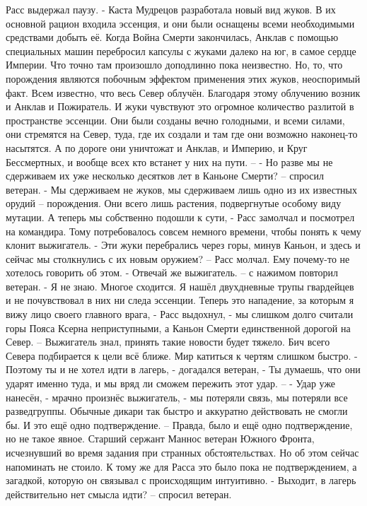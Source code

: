 \documentclass[a4paper, 12pt]{report}
\begin{document}
Расс выдержал паузу.
- Каста Мудрецов разработала новый вид жуков. В их основной рацион входила эссенция, и они были оснащены всеми необходимыми средствами добыть её. Когда Война Смерти закончилась, Анклав с помощью специальных машин перебросил капсулы с жуками далеко на юг, в самое сердце Империи. Что точно там произошло доподлинно пока неизвестно. Но, то, что порождения являются побочным эффектом применения этих жуков, неоспоримый факт. Всем известно, что весь Север облучён. Благодаря этому облучению возник и Анклав и Пожиратель. И жуки чувствуют это огромное количество разлитой в пространстве эссенции. Они были созданы вечно голодными, и всеми силами, они стремятся на Север, туда, где их создали и там где они возможно наконец-то насытятся. А по дороге они уничтожат и Анклав, и Империю, и Круг Бессмертных, и вообще всех кто встанет у них на пути. –
- Но разве мы не сдерживаем их уже несколько десятков лет в Каньоне Смерти? – спросил ветеран.
- Мы сдерживаем не жуков, мы сдерживаем лишь одно из их известных орудий – порождения. Они всего лишь растения, подвергнутые особому виду мутации. А теперь мы собственно подошли к сути, - Расс замолчал и посмотрел на командира. Тому потребовалось совсем немного времени,  чтобы понять к чему клонит выжигатель.
- Эти жуки перебрались через горы, минув Каньон, и здесь и сейчас мы столкнулись с их новым оружием? –
Расс молчал. Ему почему-то не хотелось говорить об этом.
- Отвечай же выжигатель. – с нажимом повторил ветеран.
- Я не знаю. Многое сходится. Я нашёл двухдневные трупы гвардейцев и не почувствовал в них ни следа эссенции. Теперь это нападение, за которым я вижу лицо своего главного врага, - Расс выдохнул, - мы слишком долго считали горы Пояса Ксерна неприступными, а Каньон Смерти единственной дорогой на Север. –
Выжигатель знал, принять такие новости будет тяжело. Бич всего Севера подбирается к цели всё ближе. 
Мир катиться к чертям слишком быстро.
- Поэтому ты и не хотел идти в лагерь, - догадался ветеран, - Ты думаешь, что они ударят именно туда, и мы вряд ли сможем пережить этот удар. –
- Удар уже нанесён, - мрачно произнёс выжигатель, - мы потеряли связь, мы потеряли все разведгруппы. Обычные дикари так быстро и аккуратно действовать не смогли бы. И это ещё одно подтверждение. –
Правда, было и ещё одно подтверждение, но не такое явное. Старший сержант Маннос ветеран Южного Фронта, исчезнувший во время задания при странных обстоятельствах. Но об этом сейчас напоминать не стоило. К тому же для Расса это было пока не подтверждением, а загадкой, которую он связывал с происходящим интуитивно.
- Выходит, в лагерь действительно нет смысла идти? – спросил ветеран.
\end{document}
